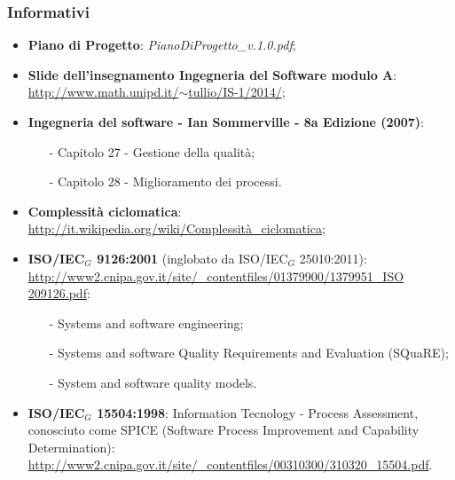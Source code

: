 \subsubsection{Informativi}
\begin{itemize}
	\item \textbf{Piano di Progetto}: \textit{PianoDiProgetto\_v.1.0.pdf};
	\item \textbf{Slide dell'insegnamento Ingegneria del Software modulo A}:\\ \href{http://www.math.unipd.it/~tullio/IS-1/2014/}{http://www.math.unipd.it/$\sim$tullio/IS-1/2014/};
	\item \textbf{Ingegneria del software - Ian Sommerville - 8a Edizione (2007)}:
	\begin{itemize}
		\item[-] Capitolo 27 - Gestione della qualità;
		\item[-] Capitolo 28 - Miglioramento dei processi.
	\end{itemize}
	\item \textbf{Complessità ciclomatica}: \href {http://it.wikipedia.org/wiki/Complessità\_ciclomatica}{http://it.wikipedia.org/wiki/Complessità\_ciclomatica};
	\item \textbf{ISO/IEC$_G$ 9126:2001} (inglobato da ISO/IEC$_G$ 25010:2011):\\
	\href{http://www2.cnipa.gov.it/site/_contentfiles/01379900/1379951_ISO \%209126.pdf}{http://www2.cnipa.gov.it/site/\_contentfiles/01379900/1379951\_ISO  209126.pdf}:
	\begin{itemize}
		\item[-] Systems and software engineering;
		\item[-] Systems and software Quality Requirements and Evaluation (SQuaRE);
		\item[-] System and software quality models.
	\end{itemize}
	\item \textbf{ISO/IEC$_G$ 15504:1998}: Information Tecnology - Process Assessment, conosciuto come SPICE (Software Process Improvement and Capability Determination): \href{http://www2.cnipa.gov.it/site/_contentfiles/00310300/310320_15504.pdf}{http://www2.cnipa.gov.it/site/\_contentfiles/00310300/310320\_15504.pdf}.
\end{itemize}